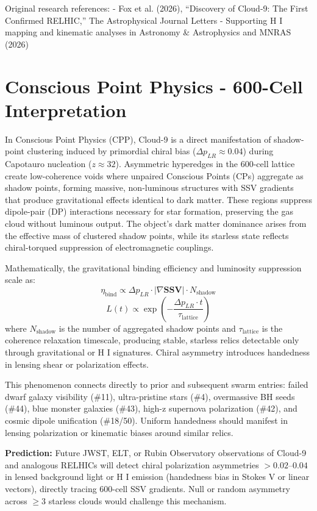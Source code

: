 \documentclass[11pt]{article}
\begin{document}
Original research references:  
- Fox et al. (2026), ``Discovery of Cloud-9: The First Confirmed RELHIC,'' The Astrophysical Journal Letters  
- Supporting H I mapping and kinematic analyses in Astronomy \& Astrophysics and MNRAS (2026)

\section{Conscious Point Physics - 600-Cell Interpretation}
In Conscious Point Physics (CPP), Cloud-9 is a direct manifestation of shadow-point clustering induced by primordial chiral bias ($\Delta p_{LR} \approx 0.04$) during Capotauro nucleation ($z \approx 32$). Asymmetric hyperedges in the 600-cell lattice create low-coherence voids where unpaired Conscious Points (CPs) aggregate as shadow points, forming massive, non-luminous structures with SSV gradients that produce gravitational effects identical to dark matter. These regions suppress dipole-pair (DP) interactions necessary for star formation, preserving the gas cloud without luminous output. The object’s dark matter dominance arises from the effective mass of clustered shadow points, while its starless state reflects chiral-torqued suppression of electromagnetic couplings.

Mathematically, the gravitational binding efficiency and luminosity suppression scale as:  
\[
\eta_{\text{bind}} \propto \Delta p_{LR} \cdot |\nabla \mathbf{SSV}| \cdot N_{\text{shadow}}
\]  
\[
L(t) \propto \exp\left(-\frac{\Delta p_{LR} \cdot t}{\tau_{\text{lattice}}}\right)
\]  
where $N_{\text{shadow}}$ is the number of aggregated shadow points and $\tau_{\text{lattice}}$ is the coherence relaxation timescale, producing stable, starless relics detectable only through gravitational or H I signatures. Chiral asymmetry introduces handedness in lensing shear or polarization effects.

This phenomenon connects directly to prior and subsequent swarm entries: failed dwarf galaxy visibility (\#11), ultra-pristine stars (\#4), overmassive BH seeds (\#44), blue monster galaxies (\#43), high-z supernova polarization (\#42), and cosmic dipole unification (\#18/50). Uniform handedness should manifest in lensing polarization or kinematic biases around similar relics.

\textbf{Prediction:} Future JWST, ELT, or Rubin Observatory observations of Cloud-9 and analogous RELHICs will detect chiral polarization asymmetries $> 0.02$--$0.04$ in lensed background light or H I emission (handedness bias in Stokes V or linear vectors), directly tracing 600-cell SSV gradients. Null or random asymmetry across $\geq 3$ starless clouds would challenge this mechanism.
\end{document}
